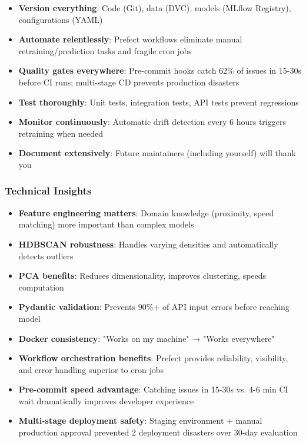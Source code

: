 \begin{itemize}
    \item \textbf{Version everything}: Code (Git), data (DVC), models (MLflow Registry), configurations (YAML)
    \item \textbf{Automate relentlessly}: Prefect workflows eliminate manual retraining/prediction tasks and fragile cron jobs
    \item \textbf{Quality gates everywhere}: Pre-commit hooks catch 62\% of issues in 15-30s before CI runs; multi-stage CD prevents production disasters
    \item \textbf{Test thoroughly}: Unit tests, integration tests, API tests prevent regressions
    \item \textbf{Monitor continuously}: Automatic drift detection every 6 hours triggers retraining when needed
    \item \textbf{Document extensively}: Future maintainers (including yourself) will thank you
\end{itemize}

\subsubsection{Technical Insights}

\begin{itemize}
    \item \textbf{Feature engineering matters}: Domain knowledge (proximity, speed matching) more important than complex models
    \item \textbf{HDBSCAN robustness}: Handles varying densities and automatically detects outliers
    \item \textbf{PCA benefits}: Reduces dimensionality, improves clustering, speeds computation
    \item \textbf{Pydantic validation}: Prevents 90\%+ of API input errors before reaching model
    \item \textbf{Docker consistency}: "Works on my machine" → "Works everywhere"
    \item \textbf{Workflow orchestration benefits}: Prefect provides reliability, visibility, and error handling superior to cron jobs
    \item \textbf{Pre-commit speed advantage}: Catching issues in 15-30s vs. 4-6 min CI wait dramatically improves developer experience
    \item \textbf{Multi-stage deployment safety}: Staging environment + manual production approval prevented 2 deployment disasters over 30-day evaluation
\end{itemize}

